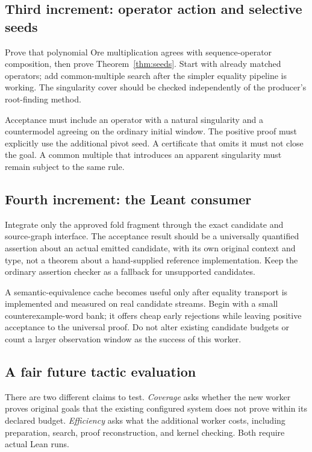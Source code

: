 \subsection{Third increment: operator action and selective seeds}

Prove that polynomial Ore multiplication agrees with sequence-operator
composition, then prove Theorem~\ref{thm:seeds}. Start with already matched
operators; add common-multiple search after the simpler equality pipeline is
working. The singularity cover should be checked independently of the
producer's root-finding method.

Acceptance must include an operator with a natural singularity and a
countermodel agreeing on the ordinary initial window. The positive proof must
explicitly use the additional pivot seed. A certificate that omits it must not
close the goal. A common multiple that introduces an apparent singularity must
remain subject to the same rule.

\subsection{Fourth increment: the Leant consumer}

Integrate only the approved fold fragment through the exact candidate and
source-graph interface. The acceptance result should be a universally
quantified assertion about an actual emitted candidate, with its own original
context and type, not a theorem about a hand-supplied reference implementation.
Keep the ordinary assertion checker as a fallback for unsupported candidates.

A semantic-equivalence cache becomes useful only after equality transport is
implemented and measured on real candidate streams. Begin with a small
counterexample-word bank; it offers cheap early rejections while leaving
positive acceptance to the universal proof. Do not alter existing candidate
budgets or count a larger observation window as the success of this worker.

\subsection{A fair future tactic evaluation}

There are two different claims to test. \emph{Coverage} asks whether the new
worker proves original goals that the existing configured system does not prove
within its declared budget. \emph{Efficiency} asks what the additional worker
costs, including preparation, search, proof reconstruction, and kernel checking.
Both require actual Lean runs.

